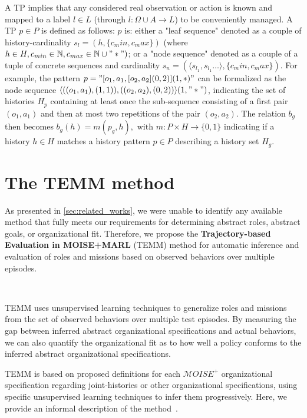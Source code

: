 \documentclass[sigconf,anonymous]{aamas}
\begin{document}
A TP implies that any considered real observation or action is known and mapped to a label $l \in L$ (through $l: \Omega \cup A \to L$) to be conveniently managed. A TP $p \in P$ is defined as follows: $p$ is: either a "leaf sequence" denoted as a couple of history-cardinality $s_l = (h, \{c_min,c_max\})$ (where $h \in H, c_{min} \in \mathbb{N}, c_{max} \in \mathbb{N} \cup "*")$; or a "node sequence" denoted as a couple of a tuple of concrete sequences and cardinality $s_n = (\langle s_{l_1}, s_{l_1}\dots \rangle, \{c_min,c_max\})$. For example, the pattern $p = \allowbreak "[o_1,a_1,[o_2,a_2](0,2)](1,*)"$ can be formalized as the node sequence $\allowbreak \langle ((o_1,a_1),(1,1)), ((o_2,a_2),(0,2))\rangle(1,"*")$, indicating the set of histories $H_p$ containing at least once the sub-sequence consisting of a first pair $(o_1,a_1)$ and then at most two repetitions of the pair $(o_2,a_2)$.
The relation $b_g$ then becomes $b_g(h) = m(p_g,h), \text{ with } m: P \times H \to \{0,1\}$ indicating if a history $h \in H$ matches a history pattern $p \in P$ describing a history set $H_g$.

\section{The TEMM method}
\label{sec:TEMM_algorithm}

As presented in \autoref{sec:related_works}, we were unable to identify any available method that fully meets our requirements for determining abstract roles, abstract goals, or organizational fit. Therefore, we propose the \textbf{Trajectory-based Evaluation in MOISE+MARL} (TEMM) method for automatic inference and evaluation of roles and missions based on observed behaviors over multiple episodes.

\

\noindent TEMM uses unsupervised learning techniques to generalize roles and missions from the set of observed behaviors over multiple test episodes. By measuring the gap between inferred abstract organizational specifications and actual behaviors, we can also quantify the organizational fit as to how well a policy conforms to the inferred abstract organizational specifications.

TEMM is based on proposed definitions for each $\mathcal{M}OISE^+$ organizational specification regarding joint-histories or other organizational specifications, using specific unsupervised learning techniques to infer them progressively. Here, we provide an informal description of the method~\hyperref[fn:github]{\footnotemark[1]}.
%
\end{document}

